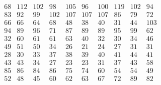 \documentclass[12pt,oneside,a4paper]{article}
\begin{document}
\begin{equation}
  \tag{Mean Tabu Duration by city table 19}
  \begin{smallmatrix} 68 & 112 & 102 & 98 & 105  & 96 & 100 & 119 & 102 & 94 \\
    83 & 92 & 99 & 102 & 107 & 107 & 107 & 86 & 79 & 72 \\ 
    66 & 66 & 64 & 68 & 48 & 38 & 40 & 31 & 44 & 103 \\
    94 & 89 & 96 & 71 & 87 & 89 & 89 & 95 & 99 & 62 \\
    32 & 60 & 61 & 61 & 63 & 40 & 32 & 30 & 34 & 46 \\
    49 & 51 & 50 & 34 & 26 & 21 & 24 & 27 & 31 & 31 \\
    28 & 30 & 33 & 37 & 38 & 39 & 40 & 41 & 44 & 41 \\
    43 & 43 & 34 & 27 & 23 & 23 & 31 & 37 & 43 & 58 \\
    85 & 86 & 84 & 86 & 75 & 74 & 60 & 54 & 54 & 49 \\
    52 & 48 & 45 & 60 & 62 & 63 & 67 & 72 & 89 & 82 \\
  \end{smallmatrix}
\end{equation}

\begin{table}[h]
  \caption{Average of the paramaters for the four configurations}
\end{table}
\end{document}
